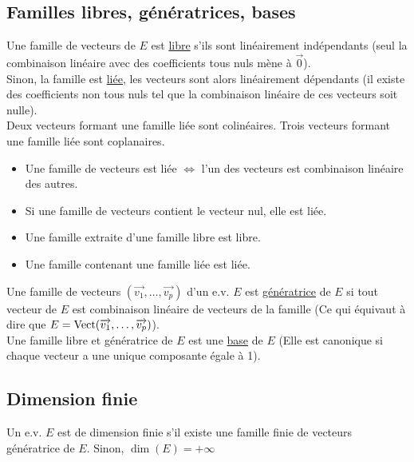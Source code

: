   \subsection{Familles libres, génératrices, bases}\label{subsec:familles-libres-generatrices-bases}
    
    Une famille de vecteurs de $E$ est \underline{libre} s'ils sont linéairement indépendants (seul la combinaison linéaire avec des coefficients tous nuls mène à $\vec 0$).\\
    
    Sinon, la famille est \underline{liée}, les vecteurs sont alors linéairement dépendants (il existe des coefficients non tous nuls tel que la combinaison linéaire de ces vecteurs soit nulle).\\
    
    Deux vecteurs formant une famille liée sont colinéaires.
    Trois vecteurs formant une famille liée sont coplanaires.\\
    
    \begin{itemize}
      \item Une famille de vecteurs est liée $\iff$ l'un des vecteurs est combinaison linéaire des autres.
      \item Si une famille de vecteurs contient le vecteur nul, elle est liée.
      \item Une famille extraite d'une famille libre est libre.
      \item Une famille contenant une famille liée est liée.\\
    \end{itemize}
    
    Une famille de vecteurs $(\vec{v_1}, \dots, \vec{v_p})$ d'un e.v. $E$ est \underline{génératrice} de $E$ si tout vecteur de $E$ est combinaison linéaire de vecteurs de la famille (Ce qui équivaut à dire que $E = \operatorname{Vect}(\overrightarrow{v_1}, \dots, \overrightarrow{v_p})$).\\
    Une famille libre et génératrice de $E$ est une \underline{base} de $E$ (Elle est canonique si chaque vecteur a une unique composante égale à 1).\\
  
  \subsection{Dimension finie}\label{subsec:dimension-finie}
    
    Un e.v. $E$ est de dimension finie s'il existe une famille finie de vecteurs génératrice de $E$.
    Sinon, $\dim(E) = +\infty$\\
    
